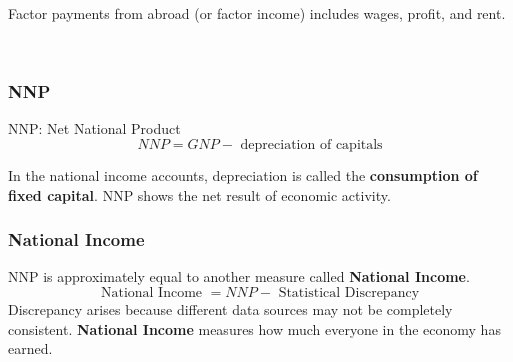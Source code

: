 \documentclass[12pt]{article}
\begin{document}
Factor payments from abroad (or factor income) includes wages, profit, and rent.


\noindent{}\\



\subsubsection{NNP}
NNP: Net National Product
\begin{equation*}
NNP = GNP - \text{ depreciation of capitals}
\end{equation*}

In the national income accounts, depreciation is called the {\textbf {consumption
of fixed capital}}.
NNP shows the net result of economic activity.

\subsubsection{National Income}
NNP is approximately equal to another measure called {\textbf {National Income}}.
\begin{equation*}
\text{ National Income } = NNP - \text{ Statistical Discrepancy }
\end{equation*}
 Discrepancy arises because different data sources may not be completely consistent.
{\textbf {National Income}} measures how much everyone in the economy has earned.


\begin{figure}[H]
\end{figure}
\end{document}
